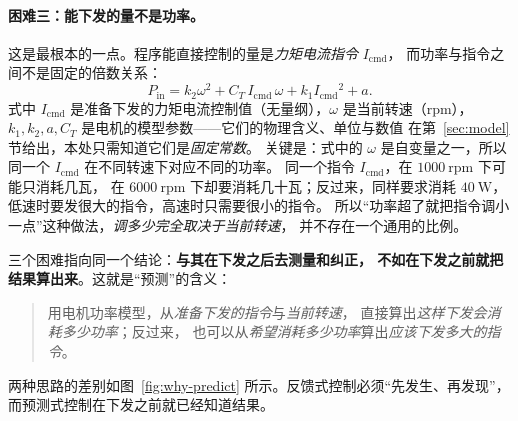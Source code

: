 \documentclass[cn,blue,11pt,device=normal]{elegantnote}
\newcommand{\Pin}{P_{\mathrm{in}}{}}
\newcommand{\Icmd}{I_{\mathrm{cmd}}{}}
\newcommand{\CT}{C_{T}{}}
\begin{document}
\paragraph{困难三：能下发的量不是功率。}
这是最根本的一点。程序能直接控制的量是\emph{力矩电流指令} $\Icmd$，
而功率与指令之间不是固定的倍数关系：
\begin{equation}\label{eq:why-nonlinear}
  \Pin = k_2\omega^2 + \CT\,\Icmd\,\omega + k_1\Icmd^2 + a .
\end{equation}
式中 $\Icmd$ 是准备下发的力矩电流控制值（无量纲），$\omega$ 是当前转速（rpm），
$k_1,k_2,a,\CT$ 是电机的模型参数——它们的物理含义、单位与数值
在第~\ref{sec:model} 节给出，本处只需知道它们是\emph{固定常数}。
关键是：式中的 $\omega$ 是自变量之一，所以同一个 $\Icmd$ 在不同转速下对应不同的功率。
同一个指令 $\Icmd$，在 $1000\ \mathrm{rpm}$ 下可能只消耗几瓦，
在 $6000\ \mathrm{rpm}$ 下却要消耗几十瓦；反过来，同样要求消耗 $40\ \mathrm{W}$，
低速时要发很大的指令，高速时只需要很小的指令。
所以“功率超了就把指令调小一点”这种做法，\emph{调多少完全取决于当前转速}，
并不存在一个通用的比例。

\medskip
三个困难指向同一个结论：\textbf{与其在下发之后去测量和纠正，
不如在下发之前就把结果算出来}。这就是“预测”的含义：

\begin{quote}
用电机功率模型，从\emph{准备下发的指令}与\emph{当前转速}，
直接算出\emph{这样下发会消耗多少功率}；反过来，
也可以从\emph{希望消耗多少功率}算出\emph{应该下发多大的指令}。
\end{quote}

两种思路的差别如图~\ref{fig:why-predict} 所示。反馈式控制必须“先发生、再发现”，
而预测式控制在下发之前就已经知道结果。
\end{document}

